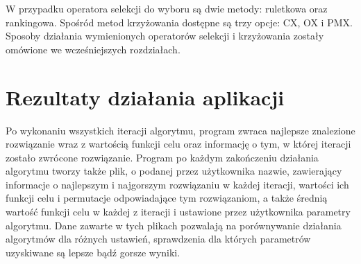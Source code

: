 W przypadku operatora selekcji do wyboru są dwie metody: ruletkowa oraz rankingowa. Spośród metod krzyżowania dostępne są trzy opcje: CX, OX i PMX. Sposoby działania wymienionych operatorów selekcji i krzyżowania zostały omówione we wcześniejszych rozdziałach.

\section{Rezultaty działania aplikacji}
Po wykonaniu wszystkich iteracji algorytmu, program zwraca najlepsze znalezione rozwiązanie wraz z wartością funkcji celu oraz informację o tym, w której iteracji zostało zwrócone rozwiązanie. Program po każdym zakończeniu działania algorytmu tworzy także plik, o podanej przez użytkownika nazwie, zawierający informacje o najlepszym i najgorszym rozwiązaniu w każdej iteracji, wartości ich funkcji celu i permutacje odpowiadające tym rozwiązaniom, a także średnią wartość funkcji celu w każdej z iteracji i ustawione przez użytkownika parametry algorytmu. Dane zawarte w tych plikach pozwalają na porównywanie działania algorytmów dla różnych ustawień, sprawdzenia dla których parametrów uzyskiwane są lepsze bądź gorsze wyniki.